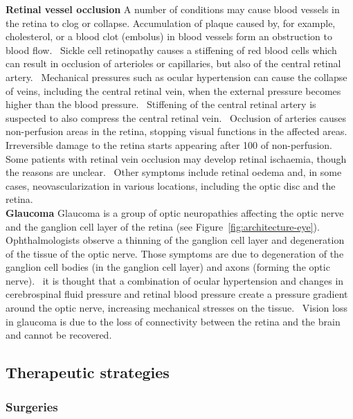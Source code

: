 \documentclass[12pt,a4paper]{journal}
\begin{document}
\textbf{Retinal vessel occlusion}
A number of conditions may cause blood vessels in the retina to clog or collapse.
Accumulation of plaque caused by, for example, cholesterol, or a blood clot (embolus) in blood vessels form an obstruction to blood flow.~\cite{Medina_2016}
Sickle cell retinopathy causes a stiffening of red blood cells which can result in occlusion of arterioles or capillaries, but also of the central retinal artery.~\cite{Medina_2016}
Mechanical pressures such as ocular hypertension can cause the collapse of veins, including the central retinal vein, when the external pressure becomes higher than the blood pressure.~\cite{Hayreh_2004}
Stiffening of the central retinal artery is suspected to also compress the central retinal vein.~\cite{Medina_2016}
Occlusion of arteries causes non-perfusion areas in the retina, stopping visual functions in the affected areas.
Irreversible damage to the retina starts appearing after \SI{100}{\min} of non-perfusion.~\cite{Hayreh_2004}
Some patients with retinal vein occlusion may develop retinal ischaemia, though the reasons are unclear.~\cite{Khayat_2018}
Other symptoms include retinal oedema and, in some cases, neovascularization in various locations, including the optic disc and the retina.~\cite{Medina_2016}
\\

\textbf{Glaucoma}
Glaucoma is a group of optic neuropathies affecting the optic nerve and the ganglion cell layer of the retina (see Figure~\ref{fig:architecture-eye}).
Ophthalmologists observe a thinning of the ganglion cell layer and degeneration of the tissue of the optic nerve.
Those symptoms are due to degeneration of the ganglion cell bodies (in the ganglion cell layer) and axons (forming the optic nerve).~\cite{Quigley_2011}
it is thought that a combination of ocular hypertension and changes in cerebrospinal fluid pressure and retinal blood pressure create a pressure gradient around the optic nerve, increasing mechanical stresses on the tissue.~\cite{Band_2009,Nickells_2012}
Vision loss in glaucoma is due to the loss of connectivity between the retina and the brain and cannot be recovered.~\cite{Quigley_2011} 


\subsection*{Therapeutic strategies}

\subsubsection*{Surgeries}
\end{document}
